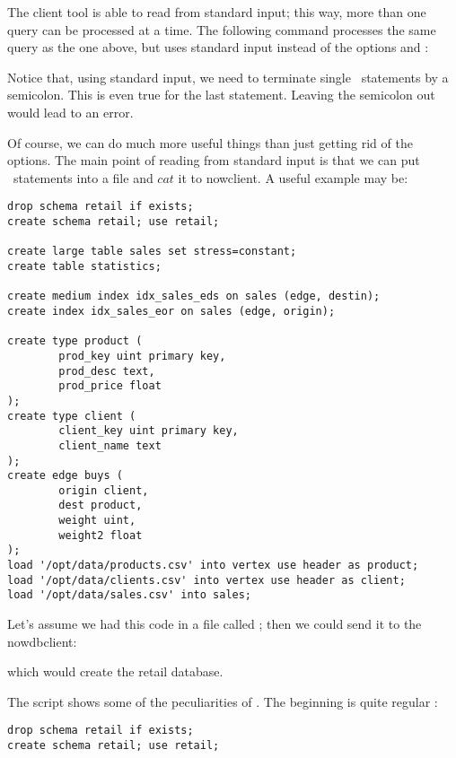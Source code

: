 The client tool is able to read from standard input;
this way, more than one query can be processed at a time.
The following command processes the same query as the one above,
but uses standard input instead of the options  and :


Notice that, using standard input,
we need to terminate single \sql\ statements
by a semicolon. This is even true for the last statement.
Leaving the semicolon out would lead to an error.

Of course, we can do much more useful things than just
getting rid of the options.
The main point of reading from standard input is
that we can put \sql\ statements into a file and
$cat$ it to nowclient. A useful example may be:

\begin{sqlcode}
\begin{lstlisting}
drop schema retail if exists;
create schema retail; use retail;

create large table sales set stress=constant;
create table statistics;

create medium index idx_sales_eds on sales (edge, destin);
create index idx_sales_eor on sales (edge, origin);

create type product (
        prod_key uint primary key,
        prod_desc text,
        prod_price float
);
create type client (
        client_key uint primary key,
        client_name text
);
create edge buys (
        origin client,
        dest product,
        weight uint,
        weight2 float
);
load '/opt/data/products.csv' into vertex use header as product;
load '/opt/data/clients.csv' into vertex use header as client;
load '/opt/data/sales.csv' into sales;
\end{lstlisting}
\end{sqlcode}

Let's assume we had this code in a file called
; then we could
send it to the nowdbclient:


which would create the retail database.

The script shows some of the peculiarities of \nowdb.
The beginning is quite regular \sql:

\begin{sqlcode}
\begin{lstlisting}
drop schema retail if exists;
create schema retail; use retail;
\end{lstlisting}
\end{sqlcode}

